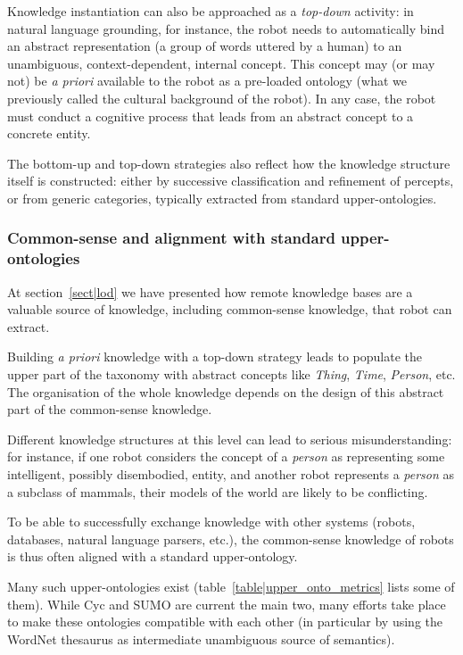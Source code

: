 \documentclass[a4paper, twocolumn]{article}
\begin{document}
Knowledge instantiation can also be approached as a \emph{top-down} activity:
in natural language grounding, for instance, the robot needs to automatically
bind an abstract representation (a group of words uttered by a human) to an
unambiguous, context-dependent, internal concept. This concept may (or may not)
be \textit{a priori} available to the robot as a pre-loaded ontology (what we
previously called the cultural background of the robot). In any case, the robot
must conduct a cognitive process that leads from an abstract concept to a
concrete entity.

The bottom-up and top-down strategies also reflect how the knowledge structure
itself is constructed: either by successive classification and refinement of
percepts, or from generic categories, typically extracted from standard
upper-ontologies.

\subsubsection{Common-sense and alignment with standard upper-ontologies}

At section~\ref{sect|lod} we have presented how remote knowledge bases are a
valuable source of knowledge, including common-sense knowledge, that robot can
extract.

Building {\it a priori} knowledge with a top-down strategy leads to populate
the upper part of the taxonomy with abstract concepts like \emph{Thing},
\emph{Time}, \emph{Person}, etc. The organisation of the whole knowledge
depends on the design of this abstract part of the common-sense knowledge.

Different knowledge structures at this level can lead to serious
misunderstanding: for instance, if one robot considers the concept of a
\emph{person} as representing some intelligent, possibly disembodied, entity,
and another robot represents a \emph{person} as a subclass of mammals, their
models of the world are likely to be conflicting.

To be able to successfully exchange knowledge with other systems (robots,
databases, natural language parsers, etc.), the common-sense knowledge of
robots is thus often aligned with a standard upper-ontology.

Many such upper-ontologies exist (table~\ref{table|upper_onto_metrics} lists
some of them). While {\sc Cyc} and SUMO are current the main two, many efforts
take place to make these ontologies compatible with each other (in particular
by using the {\sc WordNet} thesaurus as intermediate unambiguous source of
semantics).
\end{document}
